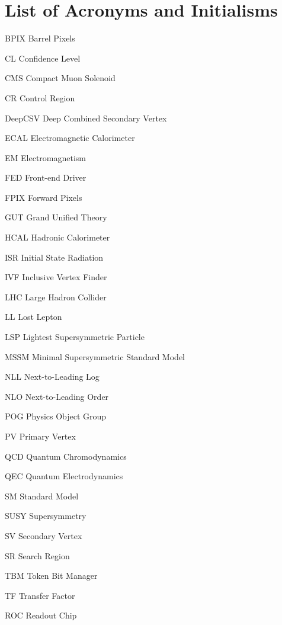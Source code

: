 \chapter{List of Acronyms and Initialisms}

\begin{abbrv}
\item[BPIX]		Barrel Pixels
\item[CL]		Confidence Level
\item[CMS]		Compact Muon Solenoid
\item[CR]		Control Region
\item[DeepCSV]		Deep Combined Secondary Vertex
\item[ECAL]		Electromagnetic Calorimeter
\item[EM]		Electromagnetism
\item[FED]		Front-end Driver
\item[FPIX]		Forward Pixels
\item[GUT]		Grand Unified Theory
\item[HCAL] 		Hadronic Calorimeter
\item[ISR]		Initial State Radiation
\item[IVF]		Inclusive Vertex Finder
\item[LHC]		Large Hadron Collider
\item[LL]		Lost Lepton
\item[LSP]		Lightest Supersymmetric Particle
\item[MSSM]		Minimal Supersymmetric Standard Model
\item[NLL]		Next-to-Leading Log
\item[NLO]		Next-to-Leading Order
\item[POG]		Physics Object Group
\item[PV] 		  Primary Vertex
\item[QCD]		Quantum Chromodynamics
\item[QEC]		Quantum Electrodynamics
\item[SM]       	Standard Model
\item[SUSY]     	Supersymmetry
\item[SV]		Secondary Vertex
\item[SR]		Search Region
\item[TBM]		Token Bit Manager
\item[TF]		Transfer Factor
\item[ROC]		Readout Chip
\end{abbrv}

